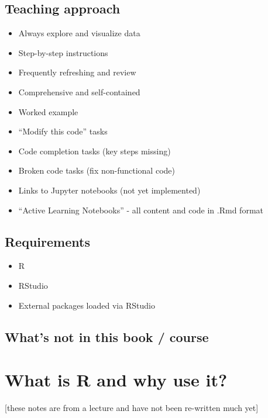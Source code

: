 \documentclass[
]{book}
\providecommand{\tightlist}{%
  \setlength{\itemsep}{0pt}\setlength{\parskip}{0pt}}
\begin{document}
\hypertarget{teaching-approach}{%
\section{Teaching approach}\label{teaching-approach}}

\begin{itemize}
\tightlist
\item
  Always explore and visualize data
\item
  Step-by-step instructions
\item
  Frequently refreshing and review
\item
  Comprehensive and self-contained
\item
  Worked example
\item
  ``Modify this code'' tasks
\item
  Code completion tasks (key steps missing)
\item
  Broken code tasks (fix non-functional code)
\item
  Links to Jupyter notebooks (not yet implemented)
\item
  ``Active Learning Notebooks'' - all content and code in .Rmd format
\end{itemize}

\hypertarget{requirements}{%
\section{Requirements}\label{requirements}}

\begin{itemize}
\tightlist
\item
  R
\item
  RStudio
\item
  External packages loaded via RStudio
\end{itemize}

\hypertarget{whats-not-in-this-book-course}{%
\section{What's not in this book / course}\label{whats-not-in-this-book-course}}

\hypertarget{what-is-r-and-why-use-it}{%
\chapter{What is R and why use it?}\label{what-is-r-and-why-use-it}}

{[}these notes are from a lecture and have not been re-written much yet{]}
\end{document}
